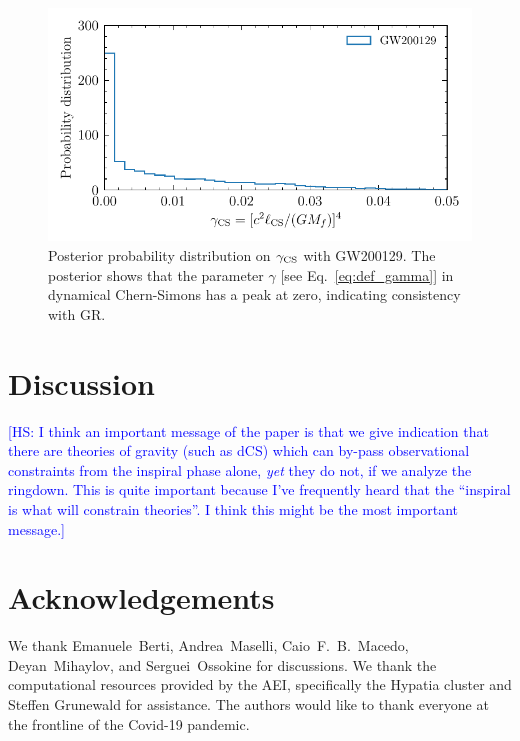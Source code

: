 \documentclass[twocolumn,prd,aps,superscriptaddress,preprintnumbers,tightenlines,showpacs,nofootinbib,eqsecnum,amsfonts,amsmath,longbibliography]{revtex4-1}
\newcommand{\hs}[1]{{\textcolor{blue}{{[HS: #1]}} }}
\begin{document}
\begin{figure}[t]
\includegraphics[width=\columnwidth]{figs/dcs_gamma_GW200129.pdf}
\caption{Posterior probability distribution on $\gamma_{\rm CS}$ with GW200129.
The posterior shows that the parameter $\gamma$ [see Eq.~\eqref{eq:def_gamma}]
in dynamical Chern-Simons has a peak at zero, indicating consistency with GR.
}
\label{fig:dCS_gamma_plot}
\end{figure}

\section{Discussion}
\label{sec:discussion}

\hs{I think an important message of the paper is that we give indication that
there are theories of gravity (such as dCS) which can by-pass observational
constraints from the inspiral phase alone, {\it yet} they do not, if we
analyze the ringdown. This is quite important because I've frequently heard
that the ``inspiral is what will constrain theories''. I think this might be
the most important message.}

\section*{Acknowledgements}
\label{sec:acknowledgements}
%
We thank Emanuele~Berti, Andrea~Maselli, Caio~F.~B.~Macedo, Deyan~Mihaylov, and
Serguei~Ossokine for discussions.
%
We thank the computational resources provided by the AEI, specifically the
{\sc Hypatia} cluster and Steffen Grunewald for assistance.
%
The authors would like to thank everyone at the frontline of the Covid-19
pandemic.

% 

\end{document}
